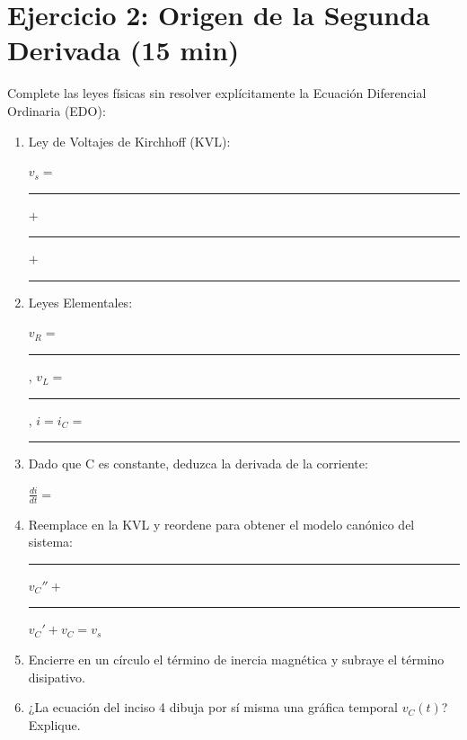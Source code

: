 \documentclass[11pt, a4paper]{article}
\begin{document}
\section*{Ejercicio 2: Origen de la Segunda Derivada (15 min)}
Complete las leyes físicas sin resolver explícitamente la Ecuación Diferencial Ordinaria (EDO):
\begin{enumerate}\setlength\itemsep{0.6cm}
    \item Ley de Voltajes de Kirchhoff (KVL): \par
    \vspace{0.1cm}
    $v_s = $ \rule{2cm}{0.4pt} $+$ \rule{2cm}{0.4pt} $+$ \rule{2cm}{0.4pt}
    
    \item Leyes Elementales: \par
    \vspace{0.1cm}
    $v_R = $ \rule{2.5cm}{0.4pt}, \quad $v_L = $ \rule{2.5cm}{0.4pt}, \quad $i = i_C = $ \rule{2.5cm}{0.4pt}
    
    \item Dado que C es constante, deduzca la derivada de la corriente: \par
    \vspace{0.1cm}
    $\frac{di}{dt} = $ \hrulefill
    
    \item Reemplace en la KVL y reordene para obtener el modelo canónico del sistema: \par
    \vspace{0.1cm}
    \rule{2cm}{0.4pt} $v_C'' + $ \rule{2cm}{0.4pt} $v_C' + v_C = v_s$
    
    \item Encierre en un círculo el término de inercia magnética y subraye el término disipativo.
    
    \item ¿La ecuación del inciso 4 dibuja por sí misma una gráfica temporal $v_C(t)$? Explique. \par
    \vspace{0.1cm}
    \hrulefill
\end{enumerate}
\end{document}
